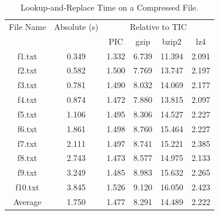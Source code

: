 \begin{table}[ht]
\centering
\begin{tabular}{cccccc}
\hline
File Name & Absolute (s) & \multicolumn{4}{c}{Relative to TIC} \\
 &  & PIC & gzip & bzip2 & lz4 \\
\hline
f1.txt & 0.349 & 1.332 & 6.739 & 11.394 & 2.091 \\
f2.txt & 0.582 & 1.500 & 7.769 & 13.747 & 2.197 \\
f3.txt & 0.781 & 1.490 & 8.032 & 14.069 & 2.177 \\
f4.txt & 0.874 & 1.472 & 7.880 & 13.815 & 2.097 \\
f5.txt & 1.106 & 1.495 & 8.306 & 14.527 & 2.227 \\
f6.txt & 1.861 & 1.498 & 8.760 & 15.464 & 2.227 \\
f7.txt & 2.111 & 1.497 & 8.741 & 15.221 & 2.385 \\
f8.txt & 2.743 & 1.473 & 8.577 & 14.975 & 2.133 \\
f9.txt & 3.249 & 1.485 & 8.983 & 15.632 & 2.265 \\
f10.txt & 3.845 & 1.526 & 9.120 & 16.050 & 2.423 \\
Average & 1.750 & 1.477 & 8.291 & 14.489 & 2.222 \\
\hline
\end{tabular}
\caption{Lookup-and-Replace Time on a Compressed File.}
\label{tab:lookup_replace_compressed}
\end{table}
